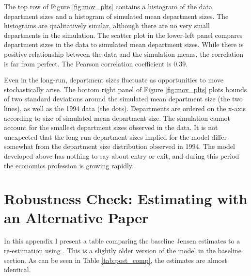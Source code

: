 \documentclass[]{article}
\begin{document}
The top row of Figure \ref{fig:mov_plts} contains a histogram of the data department sizes
and a histogram of simulated mean department sizes.  The histograms are qualitatively similar,
although there are no very small departments in the simulation.  The scatter plot in the 
lower-left panel compares department sizes in the data to simulated mean department sizes.
While there is positive relationship between the data and the simulation
means, the correlation is far from perfect. The Pearson correlation coefficient is 0.39.

Even in the long-run, department sizes fluctuate as opportunities to move stochastically
arise.  The bottom right panel of Figure \ref{fig:mov_plts} plots bounds
of two standard deviations around the simulated mean department size (the two lines), as well
as the 1994 data (the dots).  Departments are ordered on the x-axis according to size of
simulated mean department size.  The simulation cannot account for 
the smallest department sizes observed in the data.  It is not unexpected that the long-run department sizes
implied for the model differ somewhat from the
department size distribution observed in 1994.  The model
developed above has nothing to say about entry or exit, and during this period the economics
profession is growing rapidly.

\section{Robustness Check: Estimating with an Alternative Paper}
\label{sec:gross}

In this appendix I present a table comparing the baseline Jensen estimates to a re-estimation using
\citet{grossman1986costs}.  This is a slightly older version of the model in the baseline section.  As can be seen in Table \ref{tab:post_comp}, the estimates are almost 
identical.
\end{document}
